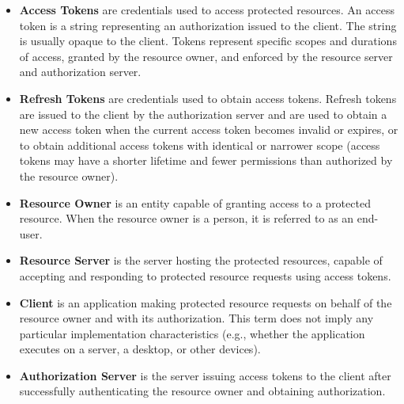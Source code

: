 \begin{itemize}
    \item \textbf{Access Tokens} are credentials used to access protected resources.
    An access token is a string representing an authorization issued to the client.
    The string is usually opaque to the client.
    Tokens represent specific scopes and
    durations of access, granted by the resource owner, and enforced by the resource server and authorization server.
    \item \textbf{Refresh Tokens} are credentials used to obtain access tokens.
    Refresh tokens are issued to the client
    by the authorization server and are used to obtain a new access token when the current access token becomes invalid or expires,
    or to obtain additional access tokens with identical or narrower scope (access tokens may have a shorter lifetime and
    fewer permissions than authorized by the resource owner).
    \item \textbf{Resource Owner} is an entity capable of granting access to a protected resource.
    When the resource owner is a person, it is referred to as an end-user.
    \item \textbf{Resource Server} is the server hosting the protected resources, capable of accepting and responding to protected
    resource requests using access tokens.
    \item \textbf{Client} is an application making protected resource requests on behalf of the resource owner and with its authorization.
    This term does not imply any particular implementation characteristics (e.g., whether the application executes on a server,
    a desktop, or other devices).
    \item \textbf{Authorization Server} is the server issuing access tokens to the client after successfully authenticating the resource owner
    and obtaining authorization.
\end{itemize}